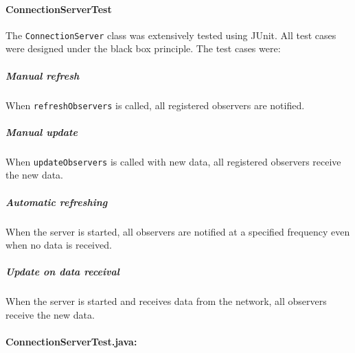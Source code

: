 \documentclass{article}
\begin{document}
\paragraph{ConnectionServerTest}

The \verb|ConnectionServer| class was extensively tested using JUnit. All test cases were designed under the black box principle. The test cases were:

\subparagraph{Manual refresh}
When \verb|refreshObservers| is called, all registered observers are notified.

\subparagraph{Manual update}
When \verb|updateObservers| is called with new data, all registered observers receive the new data.

\subparagraph{Automatic refreshing}
When the server is started, all observers are notified at a specified frequency even when no data is received.

\subparagraph{Update on data receival}
When the server is started and receives data from the network, all observers receive the new data.

\paragraph{ConnectionServerTest.java:}
\end{document}
